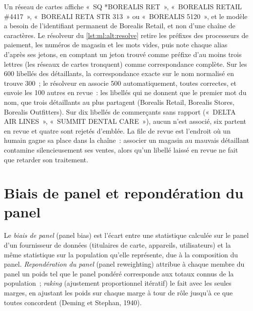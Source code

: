 Un réseau de cartes affiche «~SQ *BOREALIS RET~», «~BOREALIS RETAIL \#4417~», «~BOREALI RETA STR 313~» ou «~BOREALIS 5120~», et
le modèle a besoin de l'identifiant permanent de Borealis Retail, et non d'une chaîne de caractères. Le résolveur du \cref{lst:ml:alt:resolve}
retire les préfixes des processeurs de paiement, les numéros de magasin et les mots vides, puis note chaque alias d'après ses jetons, en comptant
un jeton trouvé comme préfixe d'au moins trois lettres (les réseaux de cartes tronquent) comme correspondance complète. Sur les 600 libellés des détaillants, la correspondance exacte
sur le nom normalisé en trouve 300~; le résolveur en associe 500 automatiquement, toutes correctes, et envoie les 100 autres en revue~:
les libellés qui ne donnent que le premier mot du nom, que trois détaillants au plus partagent (Borealis Retail, Borealis Stores,
Borealis Outfitters). Sur dix libellés de commerçants sans rapport («~DELTA AIR LINES~», «~SUMMIT DENTAL CARE~»), aucun n'est associé,
six partent en revue et quatre sont rejetés d'emblée. La file de revue est l'endroit où un humain gagne sa place dans la chaîne~:
associer un magasin au mauvais détaillant contamine silencieusement ses ventes, alors qu'un libellé laissé en revue ne fait que retarder son traitement.

\section{Biais de panel et repondération du panel}

\begin{definition}\label{def:ml:alternative-data-pipelines:panel}
Le \emph{biais de panel} (panel bias) est l'écart entre une statistique calculée sur le panel d'un fournisseur de données (titulaires de carte,
appareils, utilisateurs) et la même statistique sur la population qu'elle représente, due à la composition du panel. \emph{Repondération
du panel} (panel reweighting) attribue à chaque membre du panel un poids tel que le panel pondéré corresponde aux
totaux connus de la population~; \emph{raking} (ajustement proportionnel itératif) le fait avec les seules marges, en ajustant les poids sur chaque marge
à tour de rôle jusqu'à ce que toutes concordent (Deming et Stephan, 1940).
\end{definition}

